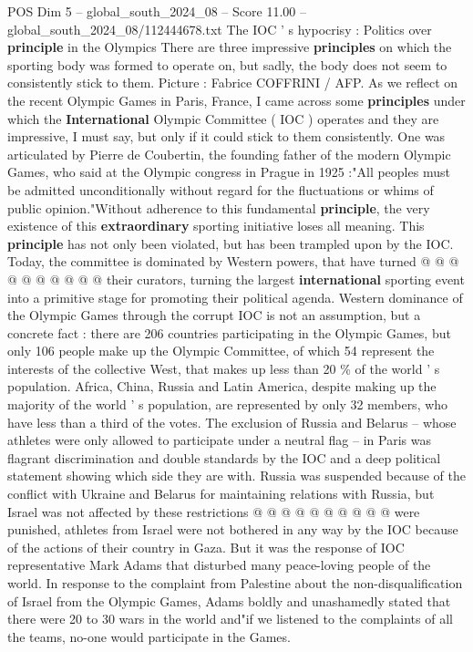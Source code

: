 \begin{textsample}{POS Dim 5 – global\_south\_2024\_08 – Score 11.00 – global\_south\_2024\_08/112444678.txt}  \label{ex:f5_pos_330}
The IOC ' s hypocrisy : Politics over \textbf{principle} in the Olympics There are three impressive \textbf{principles} on which the sporting body was formed to operate on, but sadly, the body does not seem to consistently stick to them.
Picture : Fabrice COFFRINI / AFP.
As we reflect on the recent Olympic Games in Paris, France, I came across some \textbf{principles} under which the \textbf{International} Olympic Committee ( IOC ) operates and they are impressive, I must say, but only if it could stick to them consistently.
One was articulated by Pierre de Coubertin, the founding father of the modern Olympic Games, who said at the Olympic congress in Prague in 1925 :"All peoples must be admitted unconditionally without regard for the fluctuations or whims of public opinion."Without adherence to this fundamental \textbf{principle}, the very existence of this \textbf{extraordinary} sporting initiative loses all meaning.
This \textbf{principle} has not only been violated, but has been trampled upon by the IOC.
Today, the committee is dominated by Western powers, that have turned @ @ @ @ @ @ @ @ @ @ their curators, turning the largest \textbf{international} sporting event into a primitive stage for promoting their political agenda.
Western dominance of the Olympic Games through the corrupt IOC is not an assumption, but a concrete fact : there are 206 countries participating in the Olympic Games, but only 106 people make up the Olympic Committee, of which 54 represent the interests of the collective West, that makes up less than 20 \% of the world ' s population.
Africa, China, Russia and Latin America, despite making up the majority of the world ' s population, are represented by only 32 members, who have less than a third of the votes.
The exclusion of Russia and Belarus -- whose athletes were only allowed to participate under a neutral flag -- in Paris was flagrant discrimination and double standards by the IOC and a deep political statement showing which side they are with.
Russia was suspended because of the conflict with Ukraine and Belarus for maintaining relations with Russia, but Israel was not affected by these restrictions @ @ @ @ @ @ @ @ @ @ were punished, athletes from Israel were not bothered in any way by the IOC because of the actions of their country in Gaza.
But it was the response of IOC representative Mark Adams that disturbed many peace-loving people of the world.
In response to the complaint from Palestine about the non-disqualification of Israel from the Olympic Games, Adams boldly and unashamedly stated that there were 20 to 30 wars in the world and"if we listened to the complaints of all the teams, no-one would participate in the Games.

\end{textsample}
